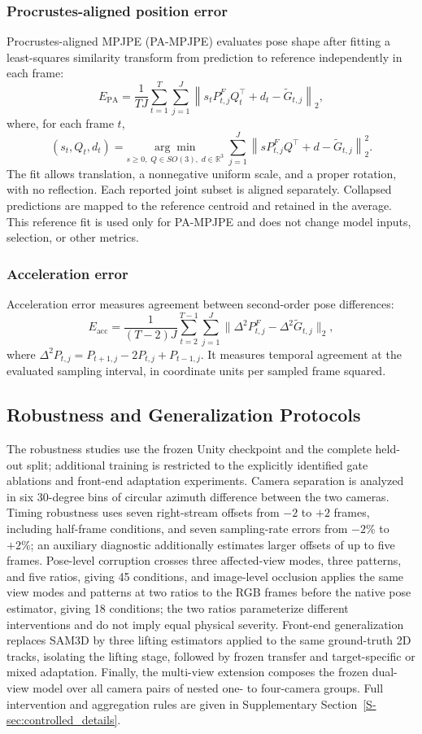 \documentclass[preprint,12pt]{elsarticle}
\begin{document}
\subsubsection{Procrustes-aligned position error}
Procrustes-aligned MPJPE (PA-MPJPE) evaluates pose shape after fitting a least-squares similarity transform from prediction to reference independently in each frame:
\[
E_{\mathrm{PA}}=\frac{1}{TJ}\sum_{t=1}^{T}\sum_{j=1}^{J}\left\|s_t P^F_{t,j}Q_t^{\top}+d_t-\tilde{G}_{t,j}\right\|_2,
\]
where, for each frame \(t\),
\[
(s_t,Q_t,d_t)=\underset{s\geq0,\;Q\in SO(3),\;d\in\mathbb{R}^3}{\arg\min}\;\sum_{j=1}^{J}\left\|sP^F_{t,j}Q^{\top}+d-\tilde{G}_{t,j}\right\|_2^2 .
\]
The fit allows translation, a nonnegative uniform scale, and a proper rotation, with no reflection. Each reported joint subset is aligned separately. Collapsed predictions are mapped to the reference centroid and retained in the average. This reference fit is used only for PA-MPJPE and does not change model inputs, selection, or other metrics.

\subsubsection{Acceleration error}
Acceleration error measures agreement between second-order pose differences:
\[
E_{\mathrm{acc}}=\frac{1}{(T-2)J}\sum_{t=2}^{T-1}\sum_{j=1}^{J}
\|\Delta^2 P^F_{t,j}-\Delta^2\tilde{G}_{t,j}\|_2,
\]
where \(\Delta^2 P_{t,j}=P_{t+1,j}-2P_{t,j}+P_{t-1,j}\). It measures temporal agreement at the evaluated sampling interval, in coordinate units per sampled frame squared.

\subsection{Robustness and Generalization Protocols}
\label{subsec:controlled_protocol}

The robustness studies use the frozen Unity checkpoint and the complete held-out split; additional training is restricted to the explicitly identified gate ablations and front-end adaptation experiments. Camera separation is analyzed in six 30-degree bins of circular azimuth difference between the two cameras. Timing robustness uses seven right-stream offsets from \(-2\) to \(+2\) frames, including half-frame conditions, and seven sampling-rate errors from \(-2\%\) to \(+2\%\); an auxiliary diagnostic additionally estimates larger offsets of up to five frames. Pose-level corruption crosses three affected-view modes, three patterns, and five ratios, giving 45 conditions, and image-level occlusion applies the same view modes and patterns at two ratios to the RGB frames before the native pose estimator, giving 18 conditions; the two ratios parameterize different interventions and do not imply equal physical severity. Front-end generalization replaces SAM3D by three lifting estimators applied to the same ground-truth 2D tracks, isolating the lifting stage, followed by frozen transfer and target-specific or mixed adaptation. Finally, the multi-view extension composes the frozen dual-view model over all camera pairs of nested one- to four-camera groups. Full intervention and aggregation rules are given in Supplementary Section~\ref{S-sec:controlled_details}.
\end{document}
